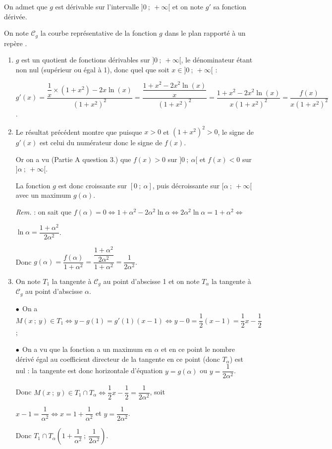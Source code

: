 On admet que $g$ est dérivable sur l'intervalle $]0~;~+ \infty[$ et on note $g'$ sa fonction dérivée.

On note $\mathcal{C}_g$ la courbe représentative de la fonction $g$ dans le plan rapporté à un repère \Oij.

\medskip

\begin{enumerate}
\item 
$g$ est un quotient de fonctions dérivables sur $]0~;~+ \infty[$, le dénominateur étant non nul (supérieur ou égal à 1), donc quel que soit $x \in ]0~;~+ \infty[$ :

$g'(x) = \dfrac{\dfrac 1x \times \left(1 + x^2\right) - 2x \ln (x)}{\left(1 + x^2\right)^2} = \dfrac{\dfrac{1 + x^2 - 2x^2\ln (x)}{x}}{\left(1 + x^2\right)^2}  = \dfrac{1 + x^2 - 2x^2\ln (x)}{x\left(1 + x^2\right)^2} = \dfrac{f(x)}{x\left(1 + x^2\right)^2}$.
\item 


Le résultat précédent montre que puisque $x > 0$ et $\left(1 + x^2\right)^2 > 0$, le signe de $g'(x)$ est celui du numérateur donc le signe de $f(x)$.

Or on a vu (Partie A question 3.) que $f(x) > 0$ sur $]0~;~\alpha[$ et $f(x) < 0$ sur $]\alpha~;~+ \infty[$.

La fonction $g$ est donc croissante sur $[0~;~\alpha]$, puis décroissante sur $[\alpha~;~+ \infty[$ avec un maximum $g(\alpha)$.

\emph{Rem.} : on sait que $f(\alpha) = 0 \iff 1 + \alpha^2 - 2\alpha^2 \ln \alpha \iff 2\alpha^2 \ln \alpha = 1 + \alpha^2 \iff $

$\ln \alpha = \dfrac{1 + \alpha^2}{2\alpha^2}$.

Donc $g(\alpha) = \dfrac{f(\alpha)}{1 + \alpha^2} = \dfrac{\dfrac{1 + \alpha^2}{2\alpha^2}}{1 + \alpha^2} = \dfrac{1}{2\alpha^2}$.
\item On note $T_1$ la tangente à $\mathcal{C}_g$ au point d'abscisse 1 et on note $T_{\alpha}$ la tangente à $\mathcal{C}_g$ au point d'abscisse $\alpha$.

$\bullet~~$On a $M(x~;~y) \in T_1 \iff y - g(1) = g'(1)(x - 1) \iff y - 0 = \dfrac12(x - 1) = \dfrac12 x - \dfrac12$ ;

$\bullet~~$On a vu que la fonction a un maximum en $\alpha$ et en ce point le nombre dérivé égal au coefficient directeur de la tangente en ce point (donc $T_{\alpha}$) est nul : la tangente est donc horizontale d'équation $y = g(\alpha)$ ou $y = \dfrac{1}{2\alpha^2}$. 


Donc $M(x~;~y) \in T_1 \cap T_{\alpha} \iff \dfrac12 x - \dfrac12 = \dfrac{1}{2\alpha^2}$, soit 

$x - 1 = \dfrac{1}{\alpha^2} \iff x = 1 + \dfrac{1}{\alpha^2}$ et $y = \dfrac{1}{2\alpha^2}$.

Donc $T_1 \cap T_{\alpha}\left(1 + \dfrac{1}{\alpha^2}~;~\dfrac{1}{2\alpha^2}\right)$.
\end{enumerate}

\bigskip
